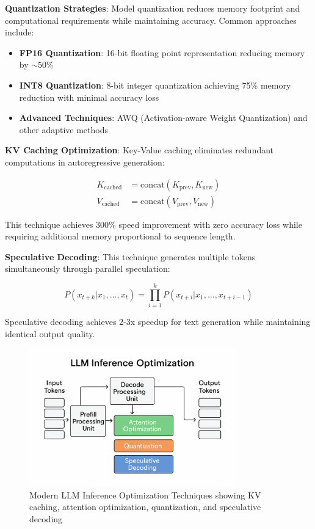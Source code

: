 \documentclass[12pt,a4paper]{article}
\begin{document}
\textbf{Quantization Strategies}: Model quantization reduces memory footprint and computational requirements while maintaining accuracy. Common approaches include:

\begin{itemize}
    \item \textbf{FP16 Quantization}: 16-bit floating point representation reducing memory by $\sim$50\%
    \item \textbf{INT8 Quantization}: 8-bit integer quantization achieving 75\% memory reduction with minimal accuracy loss
    \item \textbf{Advanced Techniques}: AWQ (Activation-aware Weight Quantization) and other adaptive methods
\end{itemize}

\textbf{KV Caching Optimization}: Key-Value caching eliminates redundant computations in autoregressive generation:

\begin{align}
K_{\text{cached}} &= \text{concat}(K_{\text{prev}}, K_{\text{new}}) \\
V_{\text{cached}} &= \text{concat}(V_{\text{prev}}, V_{\text{new}})
\end{align}

This technique achieves 300\% speed improvement with zero accuracy loss while requiring additional memory proportional to sequence length.

\textbf{Speculative Decoding}: This technique generates multiple tokens simultaneously through parallel speculation:

\begin{equation}
P(x_{t+k}|x_1,\ldots,x_t) = \prod_{i=1}^{k} P(x_{t+i}|x_1,\ldots,x_{t+i-1})
\end{equation}

Speculative decoding achieves 2-3x speedup for text generation while maintaining identical output quality.

\begin{figure}[h]
    \centering
    \includegraphics[width=0.8\textwidth]{llm_inference.png}
    \caption{Modern LLM Inference Optimization Techniques showing KV caching, attention optimization, quantization, and speculative decoding}
    \label{fig:inference_market}
\end{figure}
\end{document}
